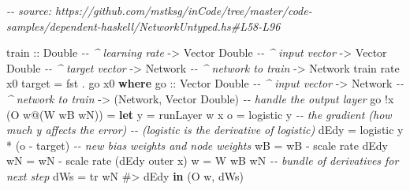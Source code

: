\documentclass[]{article}
\newenvironment{Shaded}{}{}
\newcommand{\CommentTok}[1]{\textcolor[rgb]{0.38,0.63,0.69}{\textit{#1}}}
\newcommand{\DataTypeTok}[1]{\textcolor[rgb]{0.56,0.13,0.00}{#1}}
\newcommand{\FunctionTok}[1]{\textcolor[rgb]{0.02,0.16,0.49}{#1}}
\newcommand{\KeywordTok}[1]{\textcolor[rgb]{0.00,0.44,0.13}{\textbf{#1}}}
\newcommand{\NormalTok}[1]{#1}
\newcommand{\OperatorTok}[1]{\textcolor[rgb]{0.40,0.40,0.40}{#1}}
\newcommand{\OtherTok}[1]{\textcolor[rgb]{0.00,0.44,0.13}{#1}}
\begin{document}
\begin{Shaded}
\begin{Highlighting}[]
\CommentTok{{-}{-} source: https://github.com/mstksg/inCode/tree/master/code{-}samples/dependent{-}haskell/NetworkUntyped.hs\#L58{-}L96}

\OtherTok{train ::} \DataTypeTok{Double}           \CommentTok{{-}{-} \^{} learning rate}
      \OtherTok{{-}>} \DataTypeTok{Vector} \DataTypeTok{Double}    \CommentTok{{-}{-} \^{} input vector}
      \OtherTok{{-}>} \DataTypeTok{Vector} \DataTypeTok{Double}    \CommentTok{{-}{-} \^{} target vector}
      \OtherTok{{-}>} \DataTypeTok{Network}          \CommentTok{{-}{-} \^{} network to train}
      \OtherTok{{-}>} \DataTypeTok{Network}
\NormalTok{train rate x0 target }\OtherTok{=} \FunctionTok{fst} \OperatorTok{.}\NormalTok{ go x0}
  \KeywordTok{where}
\OtherTok{    go ::} \DataTypeTok{Vector} \DataTypeTok{Double}    \CommentTok{{-}{-} \^{} input vector}
       \OtherTok{{-}>} \DataTypeTok{Network}          \CommentTok{{-}{-} \^{} network to train}
       \OtherTok{{-}>}\NormalTok{ (}\DataTypeTok{Network}\NormalTok{, }\DataTypeTok{Vector} \DataTypeTok{Double}\NormalTok{)}
    \CommentTok{{-}{-} handle the output layer}
\NormalTok{    go }\OperatorTok{!}\NormalTok{x (}\DataTypeTok{O}\NormalTok{ w}\OperatorTok{@}\NormalTok{(}\DataTypeTok{W}\NormalTok{ wB wN))}
        \OtherTok{=} \KeywordTok{let}\NormalTok{ y    }\OtherTok{=}\NormalTok{ runLayer w x}
\NormalTok{              o    }\OtherTok{=}\NormalTok{ logistic y}
              \CommentTok{{-}{-} the gradient (how much y affects the error)}
              \CommentTok{{-}{-}   (logistic\textquotesingle{} is the derivative of logistic)}
\NormalTok{              dEdy }\OtherTok{=}\NormalTok{ logistic\textquotesingle{} y }\OperatorTok{*}\NormalTok{ (o }\OperatorTok{{-}}\NormalTok{ target)}
              \CommentTok{{-}{-} new bias weights and node weights}
\NormalTok{              wB\textquotesingle{}  }\OtherTok{=}\NormalTok{ wB }\OperatorTok{{-}}\NormalTok{ scale rate dEdy}
\NormalTok{              wN\textquotesingle{}  }\OtherTok{=}\NormalTok{ wN }\OperatorTok{{-}}\NormalTok{ scale rate (dEdy }\OtherTok{\textasciigrave{}outer\textasciigrave{}}\NormalTok{ x)}
\NormalTok{              w\textquotesingle{}   }\OtherTok{=} \DataTypeTok{W}\NormalTok{ wB\textquotesingle{} wN\textquotesingle{}}
              \CommentTok{{-}{-} bundle of derivatives for next step}
\NormalTok{              dWs  }\OtherTok{=}\NormalTok{ tr wN }\OperatorTok{\#>}\NormalTok{ dEdy}
          \KeywordTok{in}\NormalTok{  (}\DataTypeTok{O}\NormalTok{ w\textquotesingle{}, dWs)}

\end{Highlighting}
\end{Shaded}
\end{document}
